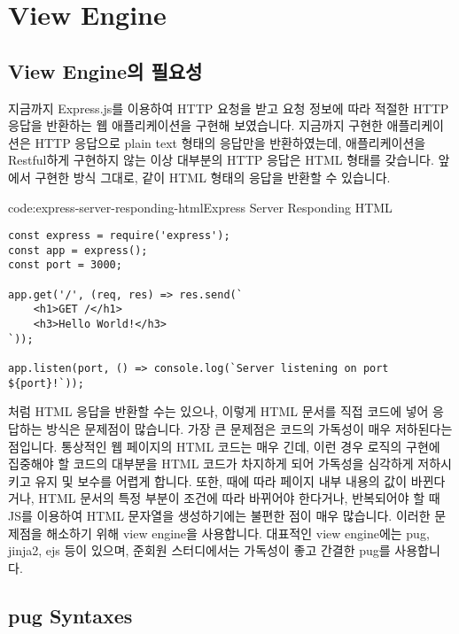 \section{View Engine}\label{sect:view-engine}

\subsection*{View Engine의 필요성}

지금까지 Express.js를 이용하여 HTTP 요청을 받고 요청 정보에 따라 적절한 HTTP 응답을 반환하는 웹 애플리케이션을 구현해 보였습니다. 지금까지 구현한 애플리케이션은 HTTP 응답으로 plain text 형태의 응답만을 반환하였는데, 애플리케이션을 Restful하게 구현하지 않는 이상 대부분의 HTTP 응답은 HTML 형태를 갖습니다. 앞에서 구현한 방식 그대로, \과 같이 HTML 형태의 응답을 반환할 수 있습니다.

\begin{codeenv}{code:express-server-responding-html}{Express Server Responding HTML}\begin{verbatim}
const express = require('express');
const app = express();
const port = 3000;

app.get('/', (req, res) => res.send(`
    <h1>GET /</h1>
    <h3>Hello World!</h3>
`));

app.listen(port, () => console.log(`Server listening on port ${port}!`));
\end{verbatim}
\end{codeenv}

처럼 HTML 응답을 반환할 수는 있으나, 이렇게 HTML 문서를 직접 코드에 넣어 응답하는 방식은 문제점이 많습니다. 가장 큰 문제점은 코드의 가독성이 매우 저하된다는 점입니다. 통상적인 웹 페이지의 HTML 코드는 매우 긴데, 이런 경우 로직의 구현에 집중해야 할 코드의 대부분을 HTML 코드가 차지하게 되어 가독성을 심각하게 저하시키고 유지 및 보수를 어렵게 합니다. 또한, 때에 따라 페이지 내부 내용의 값이 바뀐다거나, HTML 문서의 특정 부분이 조건에 따라 바뀌어야 한다거나, 반복되어야 할 때 JS를 이용하여 HTML 문자열을 생성하기에는 불편한 점이 매우 많습니다. 이러한 문제점을 해소하기 위해 view engine을 사용합니다. 대표적인 view engine에는 pug, jinja2, ejs 등이 있으며, 준회원 스터디에서는 가독성이 좋고 간결한 pug를 사용합니다.

\subsection*{pug Syntaxes}

